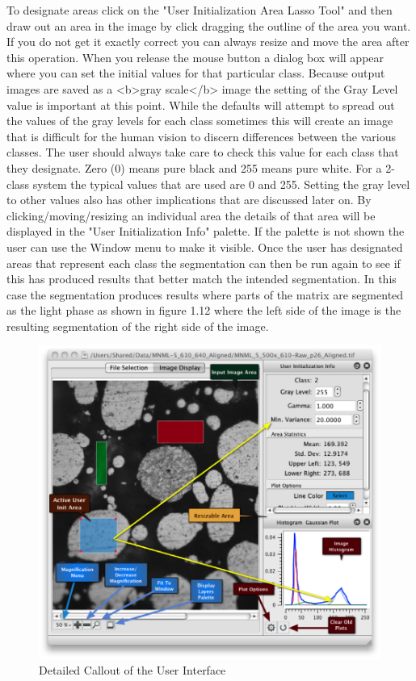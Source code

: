 \documentclass[12pt,oneside]{book}
\begin{document}
  To designate areas click on the "User Initialization Area Lasso Tool" and then draw out an area in the image by click dragging the outline of the area you want. If you do not get it exactly correct you can always resize and move the area after this operation. When you release the mouse button a dialog box will appear where you can set the initial values for that particular class. Because output images are saved as a <b>gray scale</b> image the setting of the Gray Level value is important at this point. While the defaults will attempt to spread out the values of the gray levels for each class sometimes this will create an image that is difficult for the human vision to discern differences between the various classes. The user should always take care to check this value for each class that they designate. Zero (0) means pure black and 255 means pure white. For a 2-class system the typical values that are used are 0 and 255. Setting the gray level to other values also has other implications that are discussed later on. By clicking/moving/resizing an individual area the details of that area will be displayed in the "User Initialization Info" palette. If the palette is not shown the user can use the Window menu to make it visible. 
Once the user has designated areas that represent each class the segmentation can then be run again to see if this has produced results that better match the intended segmentation. In this case the segmentation produces results where parts of the matrix are segmented as the light phase as shown in figure 1.12 where the left side of the image is the resulting segmentation of the right side of the image.
 

\begin{figure}[htbp]
\begin{center}
\includegraphics[width=6.25in]{images/Untitled10.png}
\caption{Detailed Callout of the User Interface}
\label{image10}
\end{center}
\end{figure}
\end{document}
